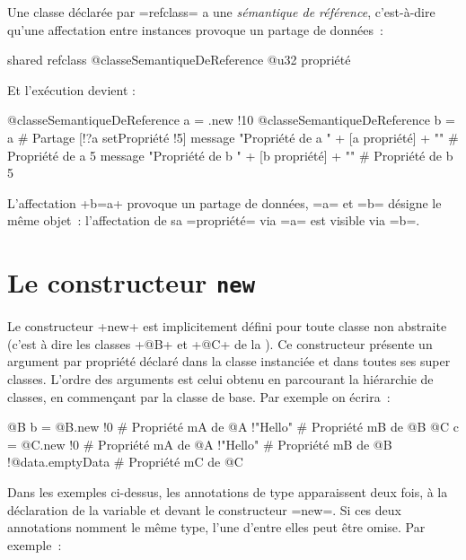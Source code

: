 
Une classe déclarée par \ggsq=refclass= a une \emph{sémantique de référence}, c'est-à-dire qu'une affectation entre instances provoque un partage de données~:

\begin{galgas4}
shared refclass @classeSemantiqueDeReference {
  @u32 propriété
}
\end{galgas4}

Et l'exécution devient :

\begin{galgas4}
@classeSemantiqueDeReference a = .new {!10}
@classeSemantiqueDeReference b = a # Partage
[!?a setPropriété !5]
message "Propriété de a " + [a propriété] + "\n" # Propriété de a 5
message "Propriété de b " + [b propriété] + "\n" # Propriété de b 5
\end{galgas4}

L'affectation \ggsq+b=a+ provoque un partage de données, \ggsq=a= et \ggsq=b= désigne le même objet~: l'affectation de sa \ggsq=propriété= via \ggsq=a= est visible via \ggsq=b=.








\section{Le constructeur \texttt{new}}

Le constructeur \ggsq+new+ est implicitement défini pour toute classe non abstraite (c'est à dire les classes \ggsq+@B+ et \ggsq+@C+ de la ). Ce constructeur présente un argument par propriété déclaré dans la classe instanciée et dans toutes ses super classes. L'ordre des arguments est celui obtenu en parcourant la hiérarchie de classes, en commençant par la classe de base. Par exemple on écrira~:

\begin{galgas4}
@B b = @B.new {
  !0 # Propriété mA de @A
  !"Hello" # Propriété mB de @B
}
@C c = @C.new {
  !0 # Propriété mA de @A
  !"Hello" # Propriété mB de @B
  !@data.emptyData # Propriété mC de @C
}
\end{galgas4}

Dans les exemples ci-dessus, les annotations de type apparaissent deux fois, à la déclaration de la variable et devant le constructeur \ggsq=new=. Si ces deux annotations nomment le même type, l'une d'entre elles peut être omise. Par exemple~:

